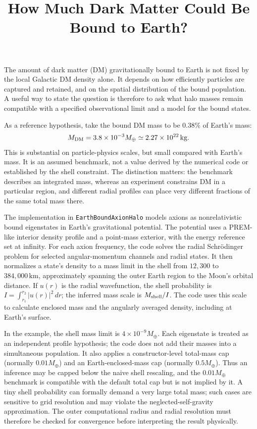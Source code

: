 \documentclass[11pt]{article}
\title{How Much Dark Matter Could Be Bound to Earth?}
\date{}
\begin{document}
\maketitle

The amount of dark matter (DM) gravitationally bound to Earth is not fixed by the local Galactic DM density alone. It depends on how efficiently particles are captured and retained, and on the spatial distribution of the bound population. A useful way to state the question is therefore to ask what halo masses remain compatible with a specified observational limit and a model for the bound states.

As a reference hypothesis, take the bound DM mass to be $0.38\%$ of Earth's mass:
\begin{equation}
  M_{\rm DM}=3.8\times10^{-3}M_\oplus
  \simeq 2.27\times10^{22}\,\mathrm{kg}.
\end{equation}
This is substantial on particle-physics scales, but small compared with Earth's mass. It is an assumed benchmark, not a value derived by the numerical code or established by the shell constraint. The distinction matters: the benchmark describes an integrated mass, whereas an experiment constrains DM in a particular region, and different radial profiles can place very different fractions of the same total mass there.

The implementation in \texttt{EarthBoundAxionHalo} models axions as nonrelativistic bound eigenstates in Earth's gravitational potential. The potential uses a PREM-like interior density profile and a point-mass exterior, with the energy reference set at infinity. For each axion frequency, the code solves the radial Schr\"odinger problem for selected angular-momentum channels and radial states. It then normalizes a state's density to a mass limit in the shell from $12{,}300$ to $384{,}000\,\mathrm{km}$, approximately spanning the outer Earth region to the Moon's orbital distance. If $u(r)$ is the radial wavefunction, the shell probability is $I=\int_{r_1}^{r_2}|u(r)|^2\,dr$; the inferred mass scale is $M_{\rm shell}/I$. The code uses this scale to calculate enclosed mass and the angularly averaged density, including at Earth's surface.

In the example, the shell mass limit is $4\times10^{-9}M_\oplus$. Each eigenstate is treated as an independent profile hypothesis; the code does not add their masses into a simultaneous population. It also applies a constructor-level total-mass cap (normally $0.01M_\oplus$) and an Earth-enclosed-mass cap (normally $0.5M_\oplus$). Thus an inference may be capped below the naive shell rescaling, and the $0.01M_\oplus$ benchmark is compatible with the default total cap but is not implied by it. A tiny shell probability can formally demand a very large total mass; such cases are sensitive to grid resolution and may violate the neglected-self-gravity approximation. The outer computational radius and radial resolution must therefore be checked for convergence before interpreting the result physically.
\end{document}
